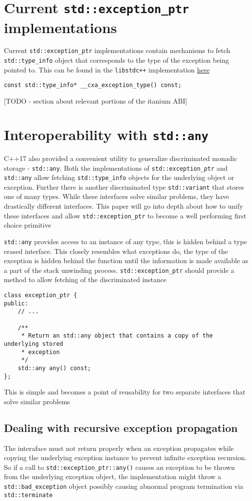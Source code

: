 \documentclass{article}
\begin{document}
\section{Current \texttt{std::exception\_ptr} implementations}
Current \texttt{std::exception\_ptr} implementations contain mechanisms to
fetch \texttt{std::type\_info} object that corresponds to the type of the
exception being pointed to.  This can be found in the \texttt{libstdc++}
implementation \href{https://goo.gl/u4oYcv}{here}
\begin{lstlisting}
const std::type_info* __cxa_exception_type() const;
\end{lstlisting}

[TODO - section about relevant portions of the itanium ABI]

\section{Interoperability with \texttt{std::any}}
C++17 also provided a convenient utility to generalize discriminated monadic
storage - \texttt{std::any}.  Both the implementations of
\texttt{std::exception\_ptr} and \texttt{std::any} allow fetching
\texttt{std::type\_info} objects for the underlying object or exception.
Further there is another discriminated type \texttt{std::variant} that stores
one of many types.  While these interfaces solve similar problems, they have
drastically different interfaces.  This paper will go into depth about how to
unify these interfaces and allow \texttt{std::exception\_ptr} to become a well
performing first choice primitive

\texttt{std::any} provides access to an instance of any type, this is hidden
behind a type erased interface.  This closely resembles what exceptions do,
the type of the exception is hidden behind the function until the information
is made available as a part of the stack unwinding process.
\texttt{std::exception\_ptr} should provide a method to allow fetching of the
discriminated instance
\begin{lstlisting}
class exception_ptr {
public:
    // ...

    /**
     * Return an std::any object that contains a copy of the underlying stored
     * exception
     */
    std::any any() const;
};
\end{lstlisting}

This is simple and becomes a point of reusability for two separate interfaces
that solve similar problems

\subsection{Dealing with recursive exception propagation}
The interaface must not return properly when an exception propagates while
copying the underlying exception instance to prevent infinite exception
recursion.  So if a call to \texttt{std::exception\_ptr::any()} causes an
exception to be thrown from the underlying exception object, the
implementation might throw a \texttt{std::bad\_exception} object possibly
causing abnormal program termination via \texttt{std::terminate}
\end{document}
